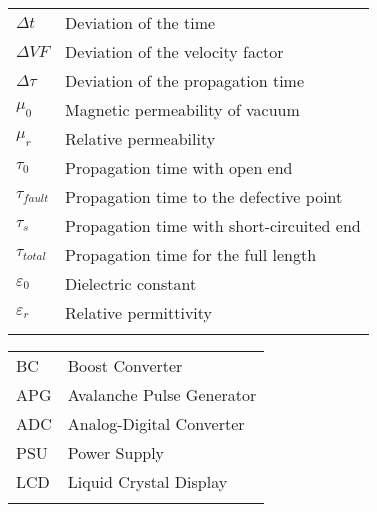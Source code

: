 \begin{longtable}[l]{@{}ll@{}}
    \( \Delta t \) & Deviation of the time\\
    \( \Delta VF \) & Deviation of the velocity factor\\
    \( \Delta \tau \) & Deviation of the propagation time\\
    \( \mu_0 \) & Magnetic permeability of vacuum\\
    \( \mu_r \) & Relative permeability\\
    \( \tau_0 \) & Propagation time with open end\\
    \( \tau_{fault} \) & Propagation time to the defective point\\
    \( \tau_s \) & Propagation time with short-circuited end\\
    \( \tau_{total} \) & Propagation time for the full length\\
    \( \varepsilon_0 \) & Dielectric constant\\
    \( \varepsilon_r \) & Relative permittivity\\
    \label{tab:glossar}
\end{longtable}
\begin{longtable}[l]{@{}ll@{}}%
    BC & Boost Converter\\
    APG & Avalanche Pulse Generator\\
    ADC & Analog-Digital Converter\\
    PSU & Power Supply\\
    LCD & Liquid Crystal Display\\
    \label{tab:glossar_acronyms}
\end{longtable}